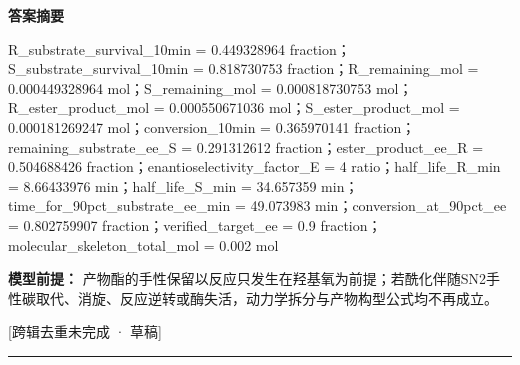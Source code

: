 \documentclass[UTF8,11pt,a4paper]{ctexart}
\begin{document}
\noindent\textbf{答案摘要}\par
R\_substrate\_survival\_10min = 0.449328964 fraction；S\_substrate\_survival\_10min = 0.818730753 fraction；R\_remaining\_mol = 0.000449328964 mol；S\_remaining\_mol = 0.000818730753 mol；R\_ester\_product\_mol = 0.000550671036 mol；S\_ester\_product\_mol = 0.000181269247 mol；conversion\_10min = 0.365970141 fraction；remaining\_substrate\_ee\_S = 0.291312612 fraction；ester\_product\_ee\_R = 0.504688426 fraction；enantioselectivity\_factor\_E = 4 ratio；half\_life\_R\_min = 8.66433976 min；half\_life\_S\_min = 34.657359 min；time\_for\_90pct\_substrate\_ee\_min = 49.073983 min；conversion\_at\_90pct\_ee = 0.802759907 fraction；verified\_target\_ee = 0.9 fraction；molecular\_skeleton\_total\_mol = 0.002 mol\par
\noindent\textbf{模型前提：}
产物酯的手性保留以反应只发生在羟基氧为前提；若酰化伴随SN2手性碳取代、消旋、反应逆转或酶失活，动力学拆分与产物构型公式均不再成立。\par
\noindent\textcolor{red!65!black}{[跨辑去重未完成 · 草稿]} \par
\medskip\hrule\medskip
{}
\end{document}
